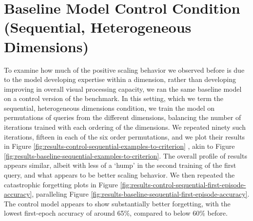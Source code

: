 \FloatBarrier
\section{Baseline Model Control Condition (Sequential, Heterogeneous Dimensions)\label{res:baseline-control}}
To examine how much of the positive scaling behavior we observed before is due to the model developing expertise within a dimension, rather than developing improving in overall visual processing capacity, we ran the same baseline model on a control version of the benchmark. In this setting, which we term the sequential, heterogeneous dimensions condition, we train the model on permutations of queries from the different dimensions, balancing the number of iterations trained with each ordering of the dimensions. We repeated ninety such iterations, fifteen in each of the six order permutations, and we plot their results in Figure \ref{fig:results-control-sequential-examples-to-criterion} , akin to Figure \ref{fig:results-baseline-sequential-examples-to-criterion}. The overall profile of results appears similar, albeit with less of a ‘hump’ in the second training of the first query, and what appears to be better scaling behavior. We then repeated the catastrophic forgetting plots in Figure \ref{fig:results-control-sequential-first-episode-accuracy}, paralleling Figure \ref{fig:results-baseline-sequential-first-episode-accuracy}. The control model appears to show substantially better forgetting, with the lowest first-epoch accuracy of around 65\%, compared to below 60\% before.


